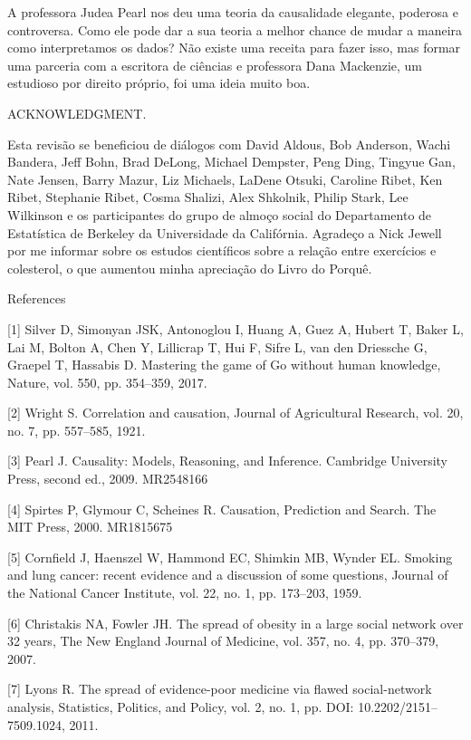     A professora Judea Pearl nos deu uma teoria da causalidade elegante, poderosa e controversa. Como ele pode dar a sua teoria a melhor chance de mudar a maneira como interpretamos os dados? Não existe uma receita para fazer isso, mas formar uma parceria com a escritora de ciências e professora Dana Mackenzie, um estudioso por direito próprio, foi uma ideia muito boa.


ACKNOWLEDGMENT.

    Esta revisão se beneficiou de diálogos com David Aldous, Bob Anderson, Wachi Bandera, Jeff Bohn, Brad DeLong, Michael Dempster, Peng Ding, Tingyue Gan, Nate Jensen, Barry Mazur, Liz Michaels, LaDene Otsuki, Caroline Ribet, Ken Ribet, Stephanie Ribet, Cosma Shalizi, Alex Shkolnik, Philip Stark, Lee Wilkinson e os participantes do grupo de almoço social do Departamento de Estatística de Berkeley da Universidade da Califórnia. Agradeço a Nick Jewell por me informar sobre os estudos científicos sobre a relação entre exercícios e colesterol, o que aumentou minha apreciação do Livro do Porquê.

References

    [1] Silver D, Simonyan JSK, Antonoglou I, Huang A, Guez A, Hubert T, Baker L, Lai M, Bolton A, Chen Y, Lillicrap T, Hui F, Sifre L, van den Driessche G, Graepel T, Hassabis D. Mastering the game of Go without human knowledge, Nature, vol. 550, pp. 354–359, 2017.

    [2] Wright S. Correlation and causation, Journal of Agricultural Research, vol. 20, no. 7, pp. 557–585, 1921.
    
    [3] Pearl J. Causality: Models, Reasoning, and Inference. Cambridge University Press, second ed., 2009. MR2548166
    
    [4] Spirtes P, Glymour C, Scheines R. Causation, Prediction and Search. The MIT Press, 2000. MR1815675
    
    [5] Cornfield J, Haenszel W, Hammond EC, Shimkin MB, Wynder EL. Smoking and lung cancer: recent evidence and a discussion of some questions, Journal of the National Cancer Institute, vol. 22, no. 1, pp. 173–203, 1959.
    
    [6] Christakis NA, Fowler JH. The spread of obesity in a large social network over 32 years, The New England Journal of Medicine, vol. 357, no. 4, pp. 370–379, 2007.
    
    [7] Lyons R. The spread of evidence-poor medicine via flawed social-network analysis, Statistics, Politics, and Policy, vol. 2, no. 1, pp. DOI: 10.2202/2151–7509.1024, 2011.
    
